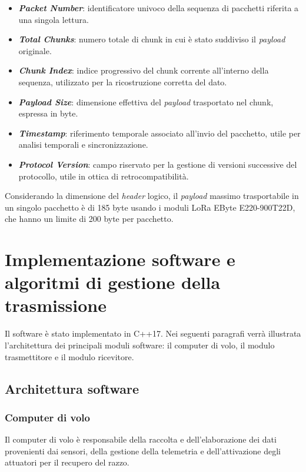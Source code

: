 \documentclass[12pt,a4paper,twoside]{book}
\begin{document}
\begin{itemize}
    \item \textbf{\emph{Packet Number}}: identificatore univoco della sequenza di pacchetti riferita a una singola lettura.
    \item \textbf{\emph{Total Chunks}}: numero totale di chunk in cui è stato suddiviso il \emph{payload} originale.
    \item \textbf{\emph{Chunk Index}}: indice progressivo del chunk corrente all'interno della sequenza, utilizzato per la ricostruzione corretta del dato.
    \item \textbf{\emph{Payload Size}}: dimensione effettiva del \emph{payload} trasportato nel chunk, espressa in byte.
    \item \textbf{\emph{Timestamp}}: riferimento temporale associato all’invio del pacchetto, utile per analisi temporali e sincronizzazione.
    \item \textbf{\emph{Protocol Version}}: campo riservato per la gestione di versioni successive del protocollo, utile in ottica di retrocompatibilità.
\end{itemize}

Considerando la dimensione del \emph{header} logico, il \emph{payload} massimo trasportabile in un singolo pacchetto
è di 185 byte usando i moduli \ac{LoRa} EByte E220-900T22D, che hanno un limite di 200 byte per pacchetto.
\newpage
\section{Implementazione software e algoritmi di gestione della trasmissione}
Il software è stato implementato in C++17. Nei seguenti paragrafi verrà illustrata
l'architettura dei principali moduli software: il computer di volo,
il modulo trasmettitore e il modulo ricevitore.

\subsection{Architettura software}

\subsubsection{Computer di volo}
Il computer di volo è responsabile della raccolta e dell'elaborazione dei dati
provenienti dai sensori, della gestione della telemetria e dell'attivazione degli
attuatori per il recupero del razzo.
\end{document}
